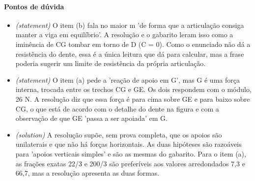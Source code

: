 \documentclass{article}%
\begin{document}
\paragraph{Pontos de dúvida}%
\begin{itemize}%
\item%
\textit{(statement)} O item (b) fala no maior m 'de forma que a articulação consiga manter a viga em equilíbrio'. A resolução e o gabarito leram isso como a iminência de CG tombar em torno de D (C = 0). Como o enunciado não dá a resistência do dente, essa é a única leitura que dá para calcular, mas a frase poderia sugerir um limite de resistência da própria articulação.%
\item%
\textit{(statement)} O item (a) pede a 'reação de apoio em G', mas G é uma força interna, trocada entre os trechos CG e GE. Os dois respondem com o módulo, 26 N. A resolução diz que essa força é para cima sobre GE e para baixo sobre CG, o que está de acordo com o detalhe do dente na figura e com a observação de que GE 'passa a ser apoiada' em G.%
\item%
\textit{(solution)} A resolução supõe, sem prova completa, que os apoios são unilaterais e que não há forças horizontais. As duas hipóteses são razoáveis para 'apoios verticais simples' e são as mesmas do gabarito. Para o item (a), as frações exatas 22/3 e 200/3 são preferíveis aos valores arredondados 7,3 e 66,7, mas a resolução apresenta as duas formas.%
\end{itemize}%
\end{document}
